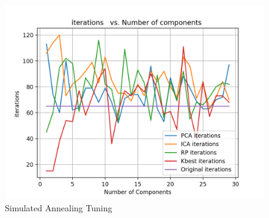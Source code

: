 \documentclass[a4paper,12pt]{article}
\begin{document}
\begin{figure}[!htb]
\begin{minipage}{0.25\textwidth}
   \end{minipage}\hfill
    \begin{minipage}{0.25\textwidth}
     \centering
     \includegraphics[width=.95\linewidth]{iter_nn_4}
   \end{minipage}\hfill
 \caption { Simulated Annealing Tuning}
\end{figure}
\end{document}
